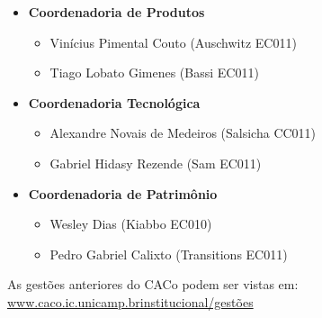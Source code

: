 \begin{itemize}
\item  \textbf{Coordenadoria de Produtos}
\begin{itemize}
\item Vinícius Pimental Couto (Auschwitz EC011)
\item Tiago Lobato Gimenes (Bassi EC011)
\end{itemize}
\end{itemize}

\begin{itemize}
\item  \textbf{Coordenadoria Tecnológica}
\begin{itemize}
\item Alexandre Novais de Medeiros (Salsicha CC011)
\item Gabriel Hidasy Rezende (Sam EC011)
\end{itemize}
\end{itemize}

\begin{itemize}
\item  \textbf{Coordenadoria de Patrimônio}
\begin{itemize}
\item Wesley Dias (Kiabbo EC010)
\item Pedro Gabriel Calixto (Transitions EC011)
\end{itemize}
\end{itemize}

As gestões anteriores do CACo podem ser vistas em:
\url{www.caco.ic.unicamp.brinstitucional/gestões}